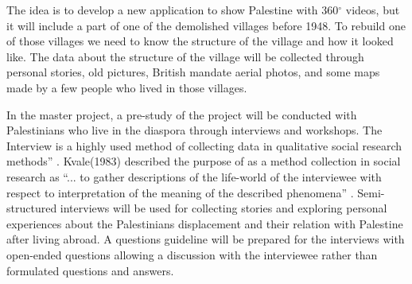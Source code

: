 The idea is to develop a new application to show Palestine with 360$^{\circ}$ videos, but it will include a part of one of the demolished villages before 1948. To rebuild one of those villages we need to know the structure of the village and how it looked like. The data about the structure of the village will be collected through personal stories, old pictures, British mandate aerial photos, and some maps made by a few people who lived in those villages. 
  
In the master project, a pre-study of the project will be conducted with Palestinians who live in the diaspora through interviews and workshops.  The Interview is a highly used method of collecting data in qualitative social research methods” \citep{Anyan2013}.  Kvale(1983)  described the purpose of as a method collection in social research as “... to gather descriptions of the life-world of the interviewee with respect to interpretation of the meaning of the described phenomena”  \citep{Kvale1983}. Semi-structured interviews will be used for collecting stories and exploring personal experiences about the Palestinians displacement and their relation with Palestine after living abroad. A questions guideline will be prepared for the interviews with  open-ended questions allowing a discussion with the interviewee rather than  formulated questions and answers.

